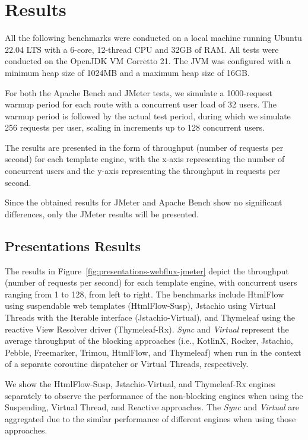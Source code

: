 \section{Results}

All the following benchmarks were conducted on a local machine running Ubuntu
22.04 LTS with a 6-core, 12-thread CPU and 32GB of RAM\@. All tests were
conducted on the OpenJDK VM Corretto 21. The JVM was configured with a minimum
heap size of 1024MB and a maximum heap size of 16GB\@.

For both the Apache Bench and JMeter tests, we simulate a 1000-request warmup
period for each route with a concurrent user load of 32 users. The warmup
period is followed by the actual test period, during which we simulate 256
requests per user, scaling in increments up to 128 concurrent users.

The results are presented in the form of throughput (number of requests per
second) for each template engine, with the x-axis representing the number of
concurrent users and the y-axis representing the throughput in requests per
second.

Since the obtained results for JMeter and Apache Bench show no significant
differences, only the JMeter results will be presented.

\subsection{Presentations Results}

The results in Figure~\ref{fig:presentations-webflux-jmeter} depict the
throughput (number of requests per second) for each template engine, with
concurrent users ranging from 1 to 128, from left to right. The benchmarks
include HtmlFlow using suspendable web templates (HtmlFlow-Susp), Jstachio
using Virtual Threads with the Iterable interface (Jstachio-Virtual), and Thymeleaf using the reactive View
Resolver driver (Thymeleaf-Rx). \textit{Sync} and \textit{Virtual} represent
the average throughput of the blocking approaches (i.e., KotlinX, Rocker,
Jstachio, Pebble, Freemarker, Trimou, HtmlFlow, and Thymeleaf) when run in the
context of a separate coroutine dispatcher or Virtual Threads, respectively.

We show the HtmlFlow-Susp, Jstachio-Virtual, and Thymeleaf-Rx engines
separately to observe the performance of the non-blocking engines when using
the Suspending, Virtual Thread, and Reactive approaches. The \textit{Sync} and
\textit{Virtual} are aggregated due to the similar performance of different
engines when using those approaches. 

